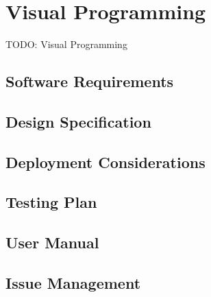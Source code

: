 \clearpage
\section{Visual Programming}

TODO: Visual Programming

\subsection{Software Requirements}

\subsection{Design Specification}

\subsection{Deployment Considerations}

\subsection{Testing Plan}

\subsection{User Manual}

\subsection{Issue Management}
